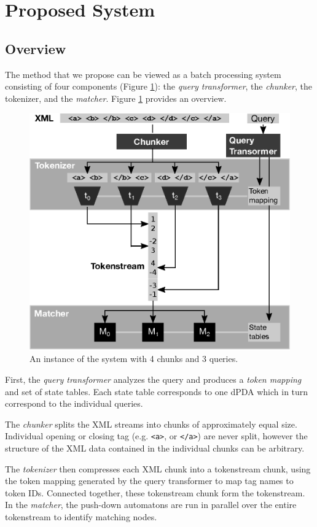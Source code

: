 \section{Proposed System}\label{sec:yourmethod}

\subsection{Overview}

The method that we propose can be viewed as a batch processing system consisting
of four components (Figure \ref{fig:methodoverview}): the \emph{query
transformer}, the \emph{chunker}, the {tokenizer}, and the \emph{matcher}.
Figure \ref{fig:methodoverview} provides an overview.

\begin{figure}[tb]\centering
	\includegraphics[width=.5\textwidth]{img/methodoverview.eps}
  \caption{An instance of the system with 4 chunks and 3 queries.}
  \label{fig:methodoverview}
\end{figure}

First, the \emph{query transformer} analyzes the query and produces a
\emph{token mapping} and set of state tables. Each state table corresponds to
one dPDA which in turn correspond to the individual queries.

The \emph{chunker} splits the XML streams into chunks of approximately equal
size. Individual opening or closing tag (e.g. \verb;<a>;, or \verb;</a>;) are
never split, however the structure of the XML data contained in the individual
chunks can be arbitrary.

The \emph{tokenizer} then compresses each XML chunk into a tokenstream chunk,
using the token mapping generated by the query transformer to map tag names to
token IDs. Connected together, these tokenstream chunk form the tokenstream. In
the \emph{matcher}, the push-down automatons are run in parallel over the
entire tokenstream to identify matching nodes.

